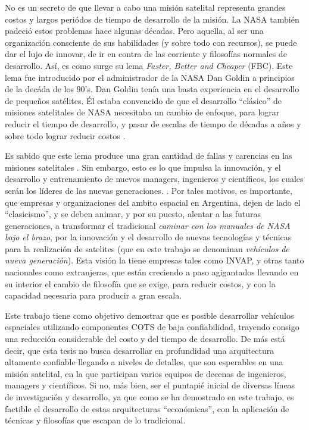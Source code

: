 No es un secreto de que llevar a cabo una misión satelital representa grandes costos
y largos periódos de tiempo de desarrollo de la misión.
La NASA también padeció estos problemas hace algunas décadas.
Pero aquella, al ser una organización consciente de sus habilidades (y sobre todo con recursos),
se puede dar el lujo de innovar, de ir en contra de las corriente y filosofías normales de desarrollo.
Así, es como surge su lema \textit{Faster, Better and Cheaper} (FBC).
Este lema fue introducido por el administrador de la NASA Dan Goldin a
principios de la decáda de los 90's. Dan Goldin tenía una basta experiencia en
el desarrollo de pequeños satélites. Él estaba convencido de que el desarrollo
``clásico'' de misiones satelitales de NASA necesitaba un cambio de enfoque,
para lograr reducir el tiempo de desarrollo, y pasar de escalas de tiempo de
décadas a años y sobre todo lograr reducir costos \citep{Paxton07}.

Es sabido que este lema produce una gran cantidad de fallas y
carencias en las misiones satelitales \citep{Paxton07}. Sin embargo,
esto es lo que impulsa la innovación, y el desarrollo y entrenamiento de nuevos
managers, ingenieros y científicos, los cuales serán los líderes de las
nuevas generaciones. \citep{Paxton07}. Por tales motivos, es importante,
que empresas y organizaciones del ambito espacial en Argentina, dejen
de lado el ``clasicismo'', y se deben animar, y por su puesto, alentar a las futuras
generaciones, a transformar el tradicional \textit{caminar con los manuales de NASA bajo
  el brazo},  por la innovación y el desarrollo de nuevas tecnologías y técnicas
para la realización de satelites (que en este trabajo se denominan
\textit{vehículos de nueva generación}). Esta visión la tiene empresas tales como INVAP,
y otras tanto nacionales como extranjeras,  que están creciendo a paso agigantados llevando
en su interior el cambio de filosofía que se exige, para reducir costos, y con la capacidad
necesaria para producir a gran escala.

Este trabajo tiene como objetivo demostrar que es posible desarrollar
vehículos espaciales utilizando componentes COTS de baja confiabilidad, trayendo
consigo una reducción considerable del costo y del tiempo de desarrollo. De más está
decir, que esta tesis no busca desarrollar en profundidad una arquitectura
altamente confiable llegando a niveles de detalles, que son esperables en una misión satelital, en la
que participan varios equipos de decenas de ingenieros, managers y científicos. Si no,
más bien, ser el puntapié inicial de diversas líneas de investigación y desarrollo,
ya que como se ha demostrado en este trabajo, es factible el desarrollo de estas arquitecturas
``económicas'', con la aplicación de técnicas y filosofías que escapan de lo tradicional.

